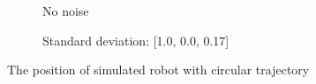 \documentclass[letterpaper,12pt]{article}
\begin{document}
\begin{figure}[H]
    \centering
    \begin{subfigure}[b]{6.5cm}
        \centering
        \captionsetup{justification=centering}
        \caption{No noise}
        \label{fig:kermit}
    \end{subfigure}
    \begin{subfigure}[b]{6.5cm}
        \centering
        \captionsetup{justification=centering}
        \caption{Standard deviation: [1.0, 0.0, 0.17]}
        \label{fig:rana}
    \end{subfigure}
\caption{The position of simulated robot with circular trajectory}
\label{fig:map2_1}
\end{figure}
\end{document}
